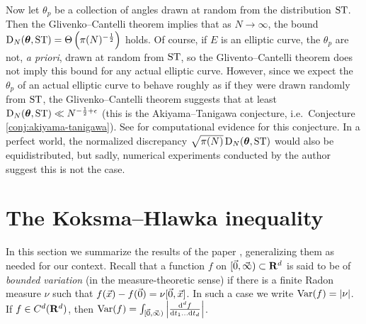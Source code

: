Now let $\theta_p$ be a collection of angles drawn at random from the 
distribution $\mathrm{ST}$. Then the Glivenko--Cantelli theorem implies that as 
$N\to \infty$, the bound 
$\operatorname{D}_N({\boldsymbol\theta},\mathrm{ST}) = \Theta\left(\pi(N)^{-\frac 1 2}\right)$ holds. Of course, 
if $E$ is an elliptic curve, the  $\theta_p$ are not, \emph{a priori}, drawn at 
random from $\mathrm{ST}$, so the Glivento--Cantelli theorem does not imply this bound 
for any actual elliptic curve. However, since we expect the $\theta_p$ of an 
actual elliptic curve to behave roughly as if they were drawn randomly from 
$\mathrm{ST}$, the Glivenko--Cantelli theorem suggests that at least 
$\operatorname{D}_N({\boldsymbol\theta},\mathrm{ST}) \ll N^{-\frac 1 2+\epsilon}$ (this is the 
Akiyama--Tanigawa conjecture, i.e.~Conjecture \ref{conj:akiyama-tanigawa}). 
See \cite{akiyama-tanigawa-1999} for computational evidence for this 
conjecture. In a perfect world, the normalized discrepancy 
$\sqrt{\pi(N)}\operatorname{D}_N({\boldsymbol\theta},\mathrm{ST})$ would also be equidistributed, but sadly, 
numerical experiments conducted by the author suggest this is not the case. 





\section{The Koksma--Hlawka inequality}

In this section we summarize the results of the paper \cite{okten-1999}, 
generalizing them as needed for our context. Recall that a function $f$ on 
$[\vec{0},\vec{\infty})\subset \mathbf{R}^d$ is said to be of \emph{bounded variation} (in 
the measure-theoretic sense) if there is a finite Radon measure $\nu$ such that 
$f(\vec{x}) - f(\vec{0}) = \nu[\vec{0},\vec{x}]$. In such a case we write 
$\operatorname{Var}(f) = |\nu|$. If $f\in C^d(\mathbf{R}^d)$, then 
$\operatorname{Var}(f) = \int_{[\vec{0},\vec{\infty})} \left|\frac{\mathrm{d}^d f}{\mathrm{d} t_1 \dots \mathrm{d} t_d} \right|$. 

